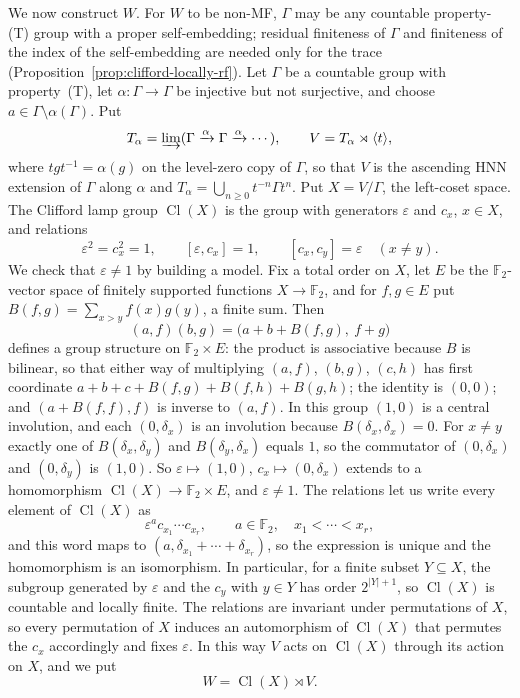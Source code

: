 \documentclass[11pt]{amsart}
\theoremstyle{plain}
\newcommand{\F}{\mathbb F}
\begin{document}
We now construct $W$.  For $W$ to be non-MF, $\Gamma$ may be any
countable property-\textup{(T)} group with a proper self-embedding;
residual finiteness of $\Gamma$ and finiteness of the index of the
self-embedding are needed only for the trace
(Proposition~\ref{prop:clifford-locally-rf}).  Let $\Gamma$ be a
countable group with property~\textup{(T)}, let
$\alpha\colon\Gamma\to\Gamma$ be injective but not surjective, and choose
$a\in\Gamma\setminus\alpha(\Gamma)$.  Put
\[
 T_\alpha=\varinjlim
   (\Gamma\xrightarrow{\alpha}\Gamma
    \xrightarrow{\alpha}\cdots),
 \qquad V=T_\alpha\rtimes\langle t\rangle,
\]
where $tgt^{-1}=\alpha(g)$ on the level-zero copy of $\Gamma$, so that
$V$ is the ascending HNN extension of $\Gamma$ along $\alpha$ and
$T_\alpha=\bigcup_{n\ge0}t^{-n}\Gamma t^n$.  Put
$X=V/\Gamma$, the left-coset space.  The Clifford lamp group
$\operatorname{Cl}(X)$ is the group with generators $\varepsilon$ and
$c_x$, $x\in X$, and relations
\[
 \varepsilon^2=c_x^2=1,\qquad [\varepsilon,c_x]=1,\qquad
 [c_x,c_y]=\varepsilon\quad(x\ne y).
\]
We check that $\varepsilon\ne1$ by building a model.  Fix a total order
on $X$, let $E$ be the $\F_2$-vector space of finitely supported
functions $X\to\F_2$, and for $f,g\in E$ put
$B(f,g)=\sum_{x>y}f(x)g(y)$, a finite sum.  Then
\[
 (a,f)(b,g)=\bigl(a+b+B(f,g),\ f+g\bigr)
\]
defines a group structure on $\F_2\times E$: the product is associative
because $B$ is bilinear, so that either way of multiplying $(a,f)$,
$(b,g)$, $(c,h)$ has first coordinate $a+b+c+B(f,g)+B(f,h)+B(g,h)$; the
identity is $(0,0)$; and $(a+B(f,f),f)$ is inverse to $(a,f)$.  In this
group $(1,0)$ is a central involution, and each $(0,\delta_x)$ is an
involution because $B(\delta_x,\delta_x)=0$.  For $x\ne y$ exactly one
of $B(\delta_x,\delta_y)$ and $B(\delta_y,\delta_x)$ equals $1$, so the
commutator of $(0,\delta_x)$ and $(0,\delta_y)$ is $(1,0)$.  So
$\varepsilon\mapsto(1,0)$, $c_x\mapsto(0,\delta_x)$ extends to a
homomorphism $\operatorname{Cl}(X)\to\F_2\times E$, and
$\varepsilon\ne1$.  The relations let us write every element of
$\operatorname{Cl}(X)$ as
\[
 \varepsilon^a c_{x_1}\cdots c_{x_r},
 \qquad a\in\F_2,\quad x_1<\cdots<x_r,
\]
and this word maps to $(a,\delta_{x_1}+\cdots+\delta_{x_r})$, so the
expression is unique and the homomorphism is an isomorphism.  In
particular, for a finite subset $Y\subseteq X$, the subgroup generated
by $\varepsilon$ and the $c_y$ with $y\in Y$ has order $2^{|Y|+1}$, so
$\operatorname{Cl}(X)$ is countable and locally finite.  The relations
are invariant under permutations of $X$, so every permutation of $X$
induces an automorphism of $\operatorname{Cl}(X)$ that permutes the
$c_x$ accordingly and fixes $\varepsilon$.  In this way $V$ acts on
$\operatorname{Cl}(X)$ through its action on $X$, and we put
\begin{equation}\label{eq:affine-clifford-witness}
 W=\operatorname{Cl}(X)\rtimes V.
\end{equation}
\end{document}
